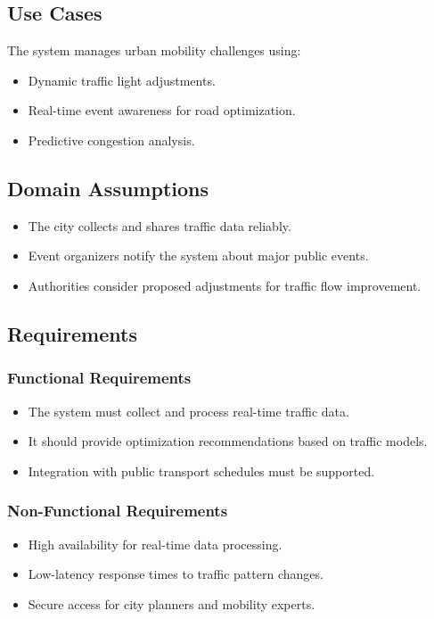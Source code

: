 \documentclass[a4paper,12pt]{article}
\begin{document}
\subsection{Use Cases}
The system manages urban mobility challenges using:
\begin{itemize}
    \item Dynamic traffic light adjustments.
    \item Real-time event awareness for road optimization.
    \item Predictive congestion analysis.
\end{itemize}

\subsection{Domain Assumptions}
\begin{itemize}
    \item The city collects and shares traffic data reliably.
    \item Event organizers notify the system about major public events.
    \item Authorities consider proposed adjustments for traffic flow improvement.
\end{itemize}

\subsection{Requirements}
\subsubsection{Functional Requirements}
\begin{itemize}
    \item The system must collect and process real-time traffic data.
    \item It should provide optimization recommendations based on traffic models.
    \item Integration with public transport schedules must be supported.
\end{itemize}

\subsubsection{Non-Functional Requirements}
\begin{itemize}
    \item High availability for real-time data processing.
    \item Low-latency response times to traffic pattern changes.
    \item Secure access for city planners and mobility experts.
\end{itemize}
\end{document}
